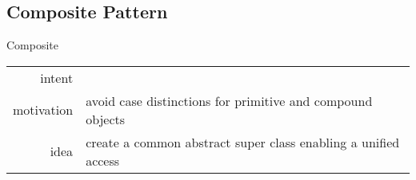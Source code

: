 \subsection{Composite Pattern}
\begin{frame}{\insertsubsection}
	\begin{fancycolumns}
		\begin{definition}{Composite \mysource{\gof}}
			\setlength\tabcolsep{1mm}
			\begin{tabularx}{\textwidth}{rX}				
				intent & \mycite{Compose objects into tree structures to represent part-whole hierarchies. Composite lets clients treat individual objects and compositions of objects uniformly.}\\
				motivation & avoid case distinctions for primitive and compound objects\\
				idea & create a common abstract super class enabling a unified access
			\end{tabularx}
		\end{definition}
		\nextcolumn
	\end{fancycolumns}
\end{frame}


